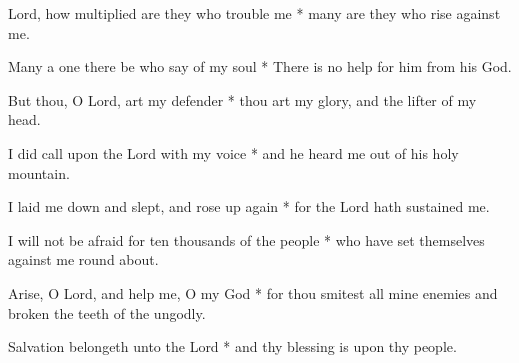 Lord, how multiplied are they who trouble me * many are they who rise against me.

Many a one there be who say of my soul * There is no help for him from his God.

But thou, O Lord, art my defender * thou art my glory, and the lifter of my head.

I did call upon the Lord with my voice * and he heard me out of his holy mountain.

I laid me down and slept, and rose up again * for the Lord hath sustained me.

I will not be afraid for ten thousands of the people * who have set themselves against me round about.

Arise, O Lord, and help me, O my God * for thou smitest all mine enemies and broken the teeth of the ungodly.

Salvation belongeth unto the Lord * and thy blessing is upon thy people.